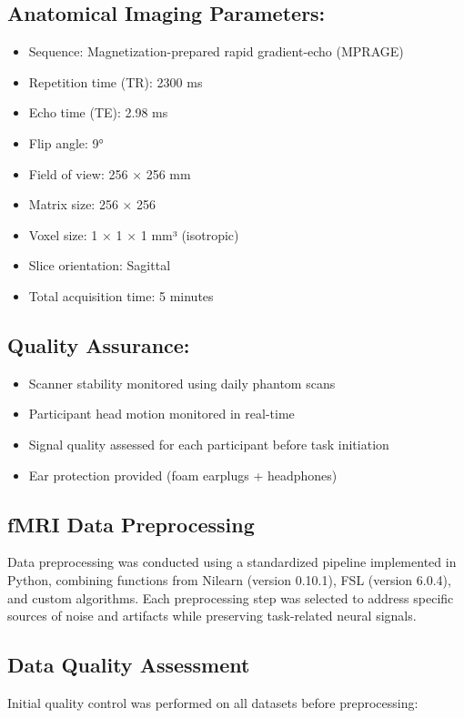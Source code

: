 \subsection*{Anatomical Imaging Parameters:}
\begin{itemize}
\item Sequence: Magnetization-prepared rapid gradient-echo (MPRAGE)
\item Repetition time (TR): 2300 ms
\item Echo time (TE): 2.98 ms
\item Flip angle: 9°
\item Field of view: 256 × 256 mm
\item Matrix size: 256 × 256
\item Voxel size: 1 × 1 × 1 mm³ (isotropic)
\item Slice orientation: Sagittal
\item Total acquisition time: 5 minutes
\end{itemize}


\subsection*{Quality Assurance:}
\begin{itemize}
\item Scanner stability monitored using daily phantom scans
\item Participant head motion monitored in real-time
\item Signal quality assessed for each participant before task initiation
\item Ear protection provided (foam earplugs + headphones)
\end{itemize}








\subsection{fMRI Data Preprocessing}
Data preprocessing was conducted using a standardized pipeline implemented in Python, combining functions from Nilearn (version 0.10.1), FSL (version 6.0.4), and custom algorithms. Each preprocessing step was selected to address specific sources of noise and artifacts while preserving task-related neural signals.

\subsection{Data Quality Assessment}
Initial quality control was performed on all datasets before preprocessing:

